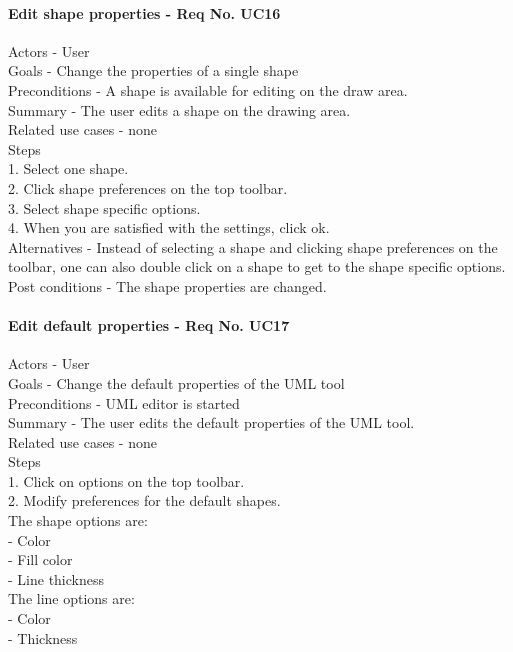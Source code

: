 \documentclass[twoside,letterpaper]{article}
\begin{document}
{\paragraph{Edit shape properties - Req No. UC16\newline}
Actors - User\\
Goals - Change the properties of a single shape\\
Preconditions - A shape is available for editing on the draw area.\\
Summary - The user edits a shape on the drawing area.\\
Related use cases - none\\
Steps\\
1. Select one shape.\\
2. Click shape preferences on the top toolbar.\\
3. Select shape specific options. \\
4. When you are satisfied with the settings, click ok.\\
Alternatives - Instead of selecting a shape and clicking shape preferences on the toolbar, one can also double click on a shape to get to the shape specific options.\\
Post conditions - The shape properties are changed.\\

\paragraph{Edit default properties - Req No. UC17\newline}
Actors - User\\
Goals - Change the default properties of the UML tool\\
Preconditions - UML editor is started\\
Summary - The user edits the default properties of the UML tool.\\
Related use cases - none\\
Steps\\
1. Click on options on the top toolbar.\\
2. Modify preferences for the default shapes.\\
\indent The shape options are:\\
- Color\\
- Fill color\\
- Line thickness\\

\indent The line options are:\\
- Color\\
- Thickness\\

}
\end{document}
